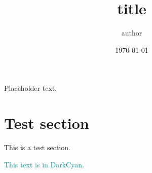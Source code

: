\documentclass{delta_base_styles}
\title{title}
\author{author}
\date{\today}
\begin{document}
\maketitle

Placeholder text.

\section{Test section}
This is a test section.

\textcolor{DarkCyan}{This text is in DarkCyan.}
\end{document}
